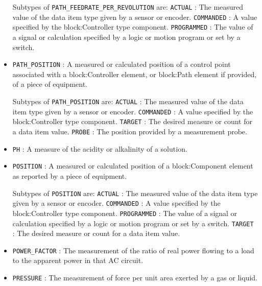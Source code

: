 \begin{itemize}
Subtypes of \texttt{PATH_FEEDRATE_PER_REVOLUTION} are: 
\newline\tab \texttt{ACTUAL} : The measured value of the data item type given by a sensor or encoder. 
\newline\tab \texttt{COMMANDED} : A value specified by the {block:Controller} type component. 
\newline\tab \texttt{PROGRAMMED} : The value of a signal or calculation specified by a logic or motion program or set by a switch. 
\item \texttt{PATH_POSITION} : A measured or calculated position of a control point associated with a {block:Controller} element, or {block:Path} element if provided, of a piece of equipment. 

Subtypes of \texttt{PATH_POSITION} are: 
\newline\tab \texttt{ACTUAL} : The measured value of the data item type given by a sensor or encoder. 
\newline\tab \texttt{COMMANDED} : A value specified by the {block:Controller} type component. 
\newline\tab \texttt{TARGET} : The desired measure or count for a data item value. 
\newline\tab \texttt{PROBE} : The position provided by a measurement probe. 
\item \texttt{PH} : A measure of the acidity or alkalinity of a solution. 

\item \texttt{POSITION} : A measured or calculated position of a {block:Component} element as reported by a piece of equipment. 

Subtypes of \texttt{POSITION} are: 
\newline\tab \texttt{ACTUAL} : The measured value of the data item type given by a sensor or encoder. 
\newline\tab \texttt{COMMANDED} : A value specified by the {block:Controller} type component. 
\newline\tab \texttt{PROGRAMMED} : The value of a signal or calculation specified by a logic or motion program or set by a switch. 
\newline\tab \texttt{TARGET} : The desired measure or count for a data item value. 
\item \texttt{POWER_FACTOR} : The measurement of the ratio of real power flowing to a load to the apparent power in that AC circuit. 

\item \texttt{PRESSURE} : The measurement of force per unit area exerted by a gas or liquid. 


\end{itemize}
